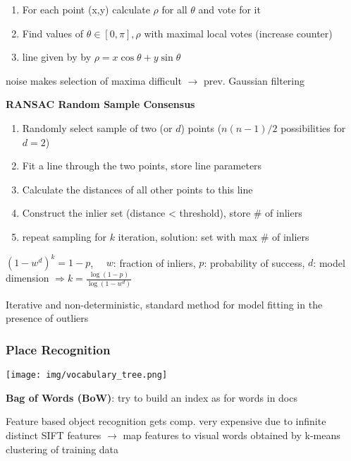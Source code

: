 \documentclass[fontsize=6pt]{scrartcl}
\begin{document}
\begin{multicols*}{4}
\begin{enumerate}
	\item For each point (x,y) calculate $\rho$ for all $\theta$  and vote for it
	\item Find values of $\theta \in [0,\pi], \rho$ with maximal local votes (increase counter)
	\item line given by by $ \rho = x\cos \theta + y \sin \theta $
\end{enumerate}

noise makes selection of maxima difficult $\rightarrow$ prev. Gaussian filtering


\textbf{RANSAC Random Sample Consensus}

\begin{enumerate}
	\item Randomly select sample of two (or $d$) points ($n(n-1)/2$ possibilities for $d=2$)
	\item Fit a line through the two points, store line parameters
	\item Calculate the distances of all other points to this line
	\item Construct the inlier set (distance < threshold), store \# of inliers
	\item repeat sampling for $k$ iteration, solution: set with max \# of inliers
\end{enumerate}
$( 1 - w^d)^k= 1-p$, $\quad w$: fraction of inliers, $p$: probability of success, $d$: model dimension
$\Rightarrow k = \frac{\log(1-p)}{\log(1-w^d)}$

Iterative and non-deterministic, standard method for model fitting in the presence of outliers


\subsubsection*{Place Recognition}

\begin{minipage}[b]{0.6\linewidth}
\texttt{[image: img/vocabulary\_tree.png]}
\end{minipage}%
\begin{minipage}[b]{0.4\linewidth}
\textbf{Bag of Words (BoW)}: try to build an index as for words in docs

Feature based object recognition gets comp. very expensive due to infinite distinct SIFT features
$\rightarrow$ map features to visual words obtained by k-means clustering of training data
\end{minipage}


\end{multicols*}
\end{document}
